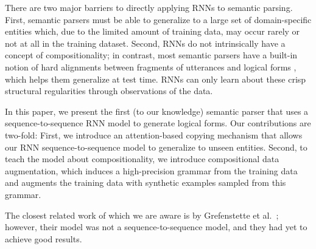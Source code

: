\documentclass[11pt,letterpaper]{article}
\newcommand\pl[1]{}
\newcommand\rj[1]{}
\begin{document}
There are two major barriers to directly applying RNNs to semantic parsing.
First, semantic parsers must be able to generalize to a large set of 
domain-specific entities which, due to the limited
amount of training data, may occur rarely or not at all
in the training dataset.
Second, RNNs do not intrinsically have a concept of compositionality;
in contrast, most semantic parsers have a built-in notion of
hard alignments between fragments of utterances and logical forms
\cite{zettlemoyer05ccg,berant2013freebase},
which helps them generalize at test time.
RNNs can only learn about these crisp structural regularities
through observations of the data.


In this paper, we present the first (to our knowledge)
semantic parser that uses a sequence-to-sequence RNN model to generate
logical forms.  
Our contributions are two-fold:
First, we introduce an attention-based copying mechanism 
that allows our RNN sequence-to-sequence model to generalize to unseen entities.
Second, to teach the model about compositionality,
we introduce compositional data augmentation,
which induces a high-precision grammar from the training data
and augments the training data with synthetic examples sampled from this grammar.


The closest related work of which we are aware is
by Grefenstette et al.~;
however, their model was not a sequence-to-sequence model,
and they had yet to achieve good results.
\rj{Here-ish?  Need to transition better.  Alternatively, move to discussion?}
\end{document}
